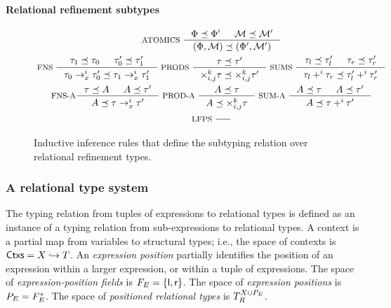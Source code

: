 \paragraph{Relational refinement subtypes}
%
\begin{figure}
  \centering
  \begin{gather*}
    \inference[ ATOMICS ]{
      \Phi \subtype \Phi' & \mathcal{M} \subtype \mathcal{M}' }{
      (\Phi, \mathcal{M}) \subtype (\Phi', \mathcal{M}') } \\
    \inference[ FNS ]{
      \tau_1 \subtype \tau_0 &
      \tau_0' \subtype \tau_1' }{
      \tau_0 \to_x^i \tau_0' \subtype \tau_1 \to_x^i \tau_1' } 
    \inference[ PRODS ]{ \tau \subtype \tau'}{
      \times_{i, j}^k \tau \subtype \times_{i, j}^k \tau'}
    \inference[ SUMS ]{
      \tau_l \subtype \tau_l' & \tau_r \subtype \tau_r' }{
      \tau_l +^i \tau_r \subtype \tau_l' +^i \tau_r' } \\
    \inference[ FNS-A]{ \tau \subtype A & A \subtype \tau' }{
      A \subtype \tau \rightarrow_x^i \tau'} 
    \inference[ PROD-A ]{ A \subtype \tau }{
      A \subtype \times^k_{i, j} \tau }
    \inference[ SUM-A ]{ A \subtype \tau & A \subtype \tau' }{
      A \subtype \tau +^i \tau' } \\
    \inference[ LFPS ]{}{} 
  \end{gather*}
  \caption{Inductive inference rules that define the subtyping relation over relational refinement types.
     }
  \label{fig:subtypes}
\end{figure}


\subsubsection{A relational type system}
\label{sec:rel-type-sys}
%
The typing relation from tuples of expressions to relational types is
defined as an instance of a typing relation from sub-expressions to
relational types.
A context is a partial map from variables to structural types;
%
i.e., the space of contexts is $\mathsf{Ctxs} = X \hookrightarrow T$.
An \emph{expression position} partially identifies the position of an
expression within a larger expression, or within a tuple of
expressions.
%
The space of \emph{expression-position fields} is
$F_E = \{  \mathsf{l}, \mathsf{r}  \}$.
%
The space of \emph{expression positions} is
$P_E = F_E^{*}$.
% 
The space of \emph{positioned relational types} is
$T_{R}^{X \cup P_E}$.

